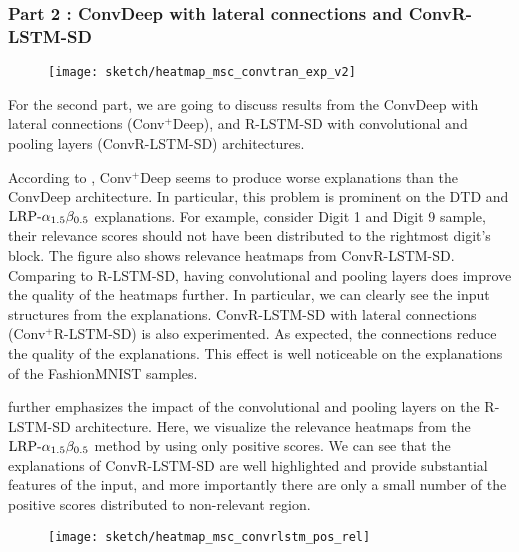 \subsubsection{Part 2 : ConvDeep with lateral connections and ConvR-LSTM-SD}
 \begin{figure}[!htb]
\centering
\texttt{[image: sketch/heatmap\_msc\_convtran\_exp\_v2]}
\label{fig:heatmap_msc_convtran_exp}
\end{figure}
For the second part, we are going to discuss results from the ConvDeep with lateral connections (Conv$^+$Deep), and R-LSTM-SD with convolutional and pooling layers (ConvR-LSTM-SD) architectures.

According to \addfigure{\ref{fig:heatmap_msc_convtran_exp}}, Conv$^+$Deep seems to produce worse explanations than the ConvDeep architecture. In particular, this problem is prominent on the DTD and $\text{LRP-}\alpha_{1.5}\beta_{0.5}$ explanations. For example, consider Digit 1 and Digit 9 sample, their relevance scores should not have been distributed to the rightmost digit's block. The figure also shows relevance heatmaps from ConvR-LSTM-SD. Comparing to R-LSTM-SD, having convolutional and pooling layers does improve  the quality of the heatmaps further. In particular, we can clearly see the input structures from the explanations.  ConvR-LSTM-SD with lateral connections (Conv$^+$R-LSTM-SD) is also experimented. As expected, the connections reduce the quality of the explanations. This effect is well noticeable on the explanations of the FashionMNIST samples.

\addfigure{\ref{fig:heatmap_msc_convrlstm_pos_rel}} further emphasizes the impact of the convolutional and pooling layers on the R-LSTM-SD architecture. Here, we visualize the relevance heatmaps from the $\text{LRP-}\alpha_{1.5}\beta_{0.5}$ method by using only positive scores. We can see that the explanations of ConvR-LSTM-SD are well highlighted and provide substantial features of the input, and more importantly  there are only a small number of the positive scores distributed to non-relevant region.



 \begin{figure}[!htb]
\centering
\texttt{[image: sketch/heatmap\_msc\_convrlstm\_pos\_rel]}
\label{fig:heatmap_msc_convrlstm_pos_rel}
\end{figure}

